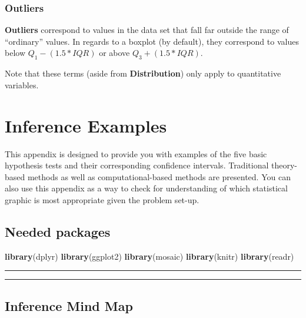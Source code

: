 \documentclass[]{tufte-book}
\newenvironment{Shaded}{\begin{snugshade}}{\end{snugshade}}
\newcommand{\KeywordTok}[1]{\textcolor[rgb]{0.13,0.29,0.53}{\textbf{{#1}}}}
\newcommand{\NormalTok}[1]{{#1}}
\let\oldrule=\rule
\renewcommand{\rule}[1]{\oldrule{\linewidth}}
\begin{document}
\subsection{Outliers}\label{outliers}

\textbf{Outliers} correspond to values in the data set that fall far
outside the range of ``ordinary'' values. In regards to a boxplot (by
default), they correspond to values below \(Q_1 - (1.5 * IQR)\) or above
\(Q_3 + (1.5 * IQR)\).

Note that these terms (aside from \textbf{Distribution}) only apply to
quantitative variables.

\chapter{Inference Examples}\label{appendixB}

This appendix is designed to provide you with examples of the five basic
hypothesis tests and their corresponding confidence intervals.
Traditional theory-based methods as well as computational-based methods
are presented. You can also use this appendix as a way to check for
understanding of which statistical graphic is most appropriate given the
problem set-up.

\section*{Needed packages}\label{needed-packages-7}

\begin{Shaded}
\begin{Highlighting}[]
\KeywordTok{library}\NormalTok{(dplyr)}
\KeywordTok{library}\NormalTok{(ggplot2)}
\KeywordTok{library}\NormalTok{(mosaic)}
\KeywordTok{library}\NormalTok{(knitr)}
\KeywordTok{library}\NormalTok{(readr)}
\end{Highlighting}
\end{Shaded}

\begin{center}\rule{0.5\linewidth}{\linethickness}\end{center}

\begin{center}\rule{0.5\linewidth}{\linethickness}\end{center}

\section{Inference Mind Map}\label{inference-mind-map}
\end{document}
